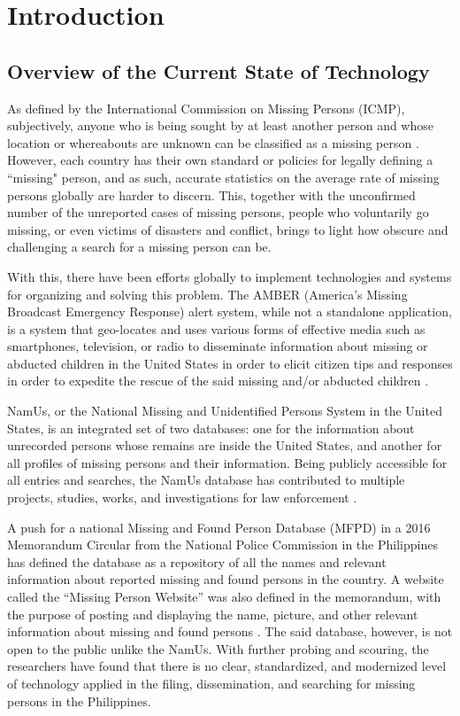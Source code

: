 \chapter{Introduction}
\label{sec:researchdesc}    %
\doublespacing

\section{Overview of the Current State of Technology}
\label{sec:overview}
As defined by the International Commission on Missing Persons (ICMP), subjectively, anyone who is being sought by at least another person and whose location or whereabouts are unknown can be classified as a missing person \cite{icmpMissing}. However, each country has their own standard or policies for legally defining a ``missing" person, and as such, accurate statistics on the average rate of missing persons globally are harder to discern. This, together with the unconfirmed number of the unreported cases of missing persons, people who voluntarily go missing, or even victims of disasters and conflict, brings to light how obscure and challenging a search for a missing person can be.

With this, there have been efforts globally to implement technologies and systems for organizing and solving this problem. The AMBER (America's Missing Broadcast Emergency Response) alert system, while not a standalone application, is a system that geo-locates and uses various forms of effective media such as smartphones, television, or radio to disseminate information about missing or abducted children in the United States in order to elicit citizen tips and responses in order to expedite the rescue of the said missing and/or abducted children \cite{griffin2007preliminary}.

NamUs, or the National Missing and Unidentified Persons System in the United States, is an integrated set of two databases: one for the information about unrecorded persons whose remains are inside the United States, and another for all profiles of missing persons and their information. Being publicly accessible for all entries and searches, the NamUs database has contributed to multiple projects, studies, works, and investigations for law enforcement \cite{murray2018history}. 

A push for a national Missing and Found Person Database (MFPD) in a 2016 Memorandum Circular from the National Police Commission in the Philippines has defined the database as a repository of all the names and relevant information about reported missing and found persons in the country. A website called the “Missing Person Website” was also defined in the memorandum, with the purpose of posting and displaying the name, picture, and other relevant information about missing and found persons \cite{NationalPoliceCommission}. The said database, however, is not open to the public unlike the NamUs. With further probing and scouring, the researchers have found that there is no clear, standardized, and modernized level of technology applied in the filing, dissemination, and searching for missing persons in the Philippines.

